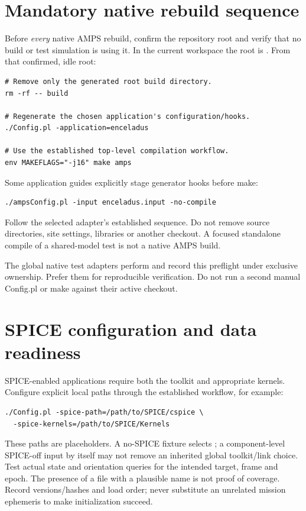\section{Mandatory native rebuild sequence}
Before \emph{every} native AMPS rebuild, confirm the repository root and verify
that no build or test simulation is using it. In the current workspace the
root is . From that confirmed, idle root:
\begin{lstlisting}
# Remove only the generated root build directory.
rm -rf -- build

# Regenerate the chosen application's configuration/hooks.
./Config.pl -application=enceladus

# Use the established top-level compilation workflow.
env MAKEFLAGS="-j16" make amps
\end{lstlisting}
Some application guides explicitly stage generator hooks before make:
\begin{lstlisting}
./ampsConfig.pl -input enceladus.input -no-compile
\end{lstlisting}
Follow the selected adapter's established sequence. Do not remove source directories,
site settings, libraries or another checkout. A focused standalone compile of
a shared-model test is not a native AMPS build.

The global native test adapters perform and record this preflight under
exclusive ownership. Prefer them for reproducible verification. Do not run a
second manual Config.pl or make against their active checkout.

\section{SPICE configuration and data readiness}
SPICE-enabled applications require both the toolkit and appropriate kernels.
Configure explicit local paths through the established workflow, for example:
\begin{lstlisting}
./Config.pl -spice-path=/path/to/SPICE/cspice \
  -spice-kernels=/path/to/SPICE/Kernels
\end{lstlisting}
These paths are placeholders. A no-SPICE fixture selects
; a component-level SPICE-off input by itself may
not remove an inherited global toolkit/link choice.
Test actual state and orientation queries for the intended target, frame and
epoch. The presence of a file with a plausible name is not proof of coverage.
Record versions/hashes and load order; never substitute an unrelated mission
ephemeris to make initialization succeed.

